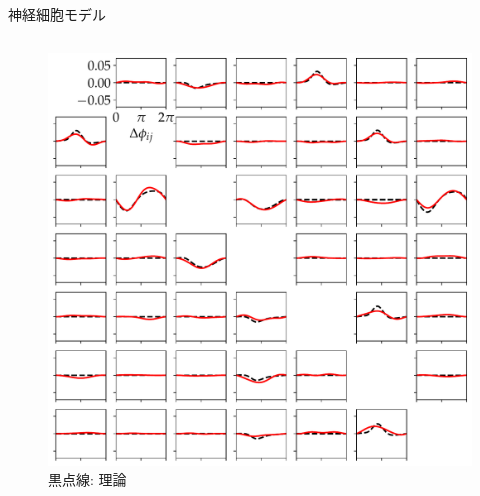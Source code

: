 \begin{frame}{神経細胞モデル}
\begin{columns}[t]
\begin{column}{0.5\textwidth}
\begin{figure}
        \includegraphics[width=\columnwidth]{figs/snn_gp_100.pdf}
        \caption*{黒点線: 理論\ }
      \end{figure}
    \end{column}
  \end{columns}
\end{frame}

